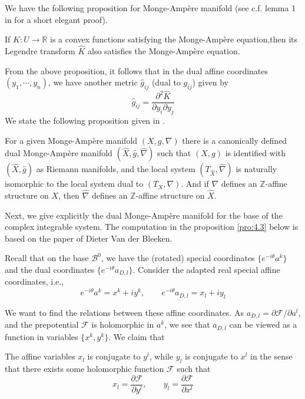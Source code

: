 \documentclass{article}
\begin{document}
We have the following proposition for Monge-Amp\`ere manifold (see c.f. lemma 1 in \cite{kontsevich2001homological} for a short elegant proof).

\begin{proposition}
If $K:U\to\mathbb{R}$ is a convex functions satisfying the Monge-Amp\`ere equation,then its Legendre transform $\widehat{K}$ also satisfies the Monge-Amp\`ere equation.
\end{proposition}

From the above proposition, it follows that in the dual affine coordinates $(y_{1},\cdots,y_{n})$, we have another metric $\widehat{g}_{ij}$ (dual to $g_{ij}$) given by \[\widehat{g}_{ij}=\frac{\partial^{2}\widehat{K}}{\partial y_{i}\partial y_{j}}\] We state the following proposition given in \cite{kontsevich2001homological}.

\begin{proposition}
For a given Monge-Amp\`ere manifold $(X,g,\nabla)$ there is a canonically defined dual Monge-Amp\`ere manifold $(\widehat{X},\widehat{g},\widehat{\nabla})$ such that $(X,g)$ is identified with $(\widehat{X},\widehat{g})$ as Riemann manifolds, and the local system $(T_{\widehat{X}},\widehat{\nabla})$ is naturally isomorphic to the local system dual to $(T_{X},\nabla)$. And if $\nabla$ defines an $\mathbb{Z}$-affine structure on $X$, then $\widehat{\nabla}$ defines an $\mathbb{Z}$-affine structure on $\widehat{X}$.
\end{proposition}

Next, we give explicitly the dual Monge-Amp\`ere manifold for the base of the complex integrable system. The computation in the proposition \ref{pro:4.3} below is based on the paper \cite{svan2012bps} of Dieter Van der Bleeken. 

Recall that on the base $\mathcal{B}^{0}$, we have the (rotated) special coordinates $\{e^{-i\theta}a^{k}\}$ and the dual coordinates  $\{e^{-i\theta}a_{D,l}\}$. Consider the adapted real special affine coordinates, i.e.,
\begin{equation}
   e^{-i\theta}a^{k}=x^{k}+iy^{k}, \qquad e^{-i\theta}a_{D,l}=x_{l}+iy_{l} 
\end{equation}


We want to find the relations between these affine coordinates. As $a_{D,l}=\partial\mathcal{F}/\partial a^{l}$, and the prepotential $\mathcal{F}$ is holomorphic in $a^{k}$, we see that $a_{D,l}$ can be viewed as a function in variables $\{x^{k},y^{k}\}$. We claim that 

\begin{proposition}\label{pro:4.3}
The affine variables $x_{l}$ is conjugate to $y^{l}$, while $y_{l}$ is conjugate to $x^{l}$ in the sense that there exists some holomorphic function $\mathscr{F}$ such that
\begin{equation}\label{eq:18}
          x_{l}=\frac{\partial\mathscr{F}}{\partial y^{l}},\qquad y_{l}=\frac{\partial\mathscr{F}}{\partial x^{l}}
\end{equation}
\end{proposition}
\end{document}
